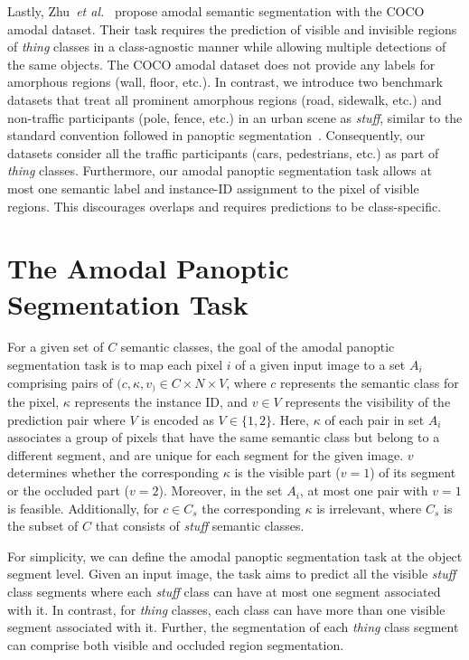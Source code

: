 \documentclass[10pt,twocolumn,letterpaper]{article}
\begin{document}
Lastly, Zhu~\textit{et al.}~\cite{zhu2017semantic} propose amodal semantic segmentation with the COCO amodal dataset. Their task requires the prediction of visible and invisible regions of \textit{thing} classes in a class-agnostic manner while allowing multiple detections of the same objects. The COCO amodal dataset does not provide any labels for amorphous regions (wall, floor, etc.). In contrast, we introduce two benchmark datasets that treat all prominent amorphous regions (road, sidewalk, etc.) and non-traffic participants (pole, fence, etc.) in an urban scene as \textit{stuff}, similar to the standard convention followed in panoptic segmentation~\cite{kirillov2019panoptic}. Consequently, our datasets consider all the traffic participants (cars, pedestrians, etc.) as part of \textit{thing} classes. Furthermore, our amodal panoptic segmentation task allows at most one semantic label and instance-ID assignment to the pixel of visible regions. This discourages overlaps and requires predictions to be class-specific. 
\section{The Amodal Panoptic Segmentation Task}
For a given set of $C$ semantic classes, the goal of the amodal panoptic segmentation task is to map each pixel $i$ of a given input image to a set $A_i$ comprising pairs of $(c, \kappa, v_) \in C \times N \times V$, where $c$ represents the semantic class for the pixel, $\kappa$ represents the instance ID, and $v \in V$ represents the visibility of the prediction pair where $V$ is encoded as $V \in \{1,2\}$. Here, $\kappa$ of each pair in set $A_i$ associates a group of pixels that have the same semantic class but belong to a different segment, and are unique for each segment for the given image. $v$ determines whether the corresponding $\kappa$ is the visible part ($v=1$) of its segment or the occluded part ($v=2$). Moreover, in the set $A_i$, at most one pair with $v=1$ is feasible. Additionally, for $ c \in C_{s}$ the corresponding $\kappa$ is irrelevant, where $C_s$ is the subset of $C$ that consists of \textit{stuff} semantic classes.  

For simplicity, we can define the amodal panoptic segmentation task at the object segment level. Given an input image, the task aims to predict all the visible \textit{stuff} class segments where each \textit{stuff} class can have at most one segment associated with it. In contrast, for \textit{thing} classes, each class can have more than one visible segment associated with it. Further, the segmentation of each \textit{thing} class segment can comprise both visible and occluded region segmentation.
%
 
\end{document}
